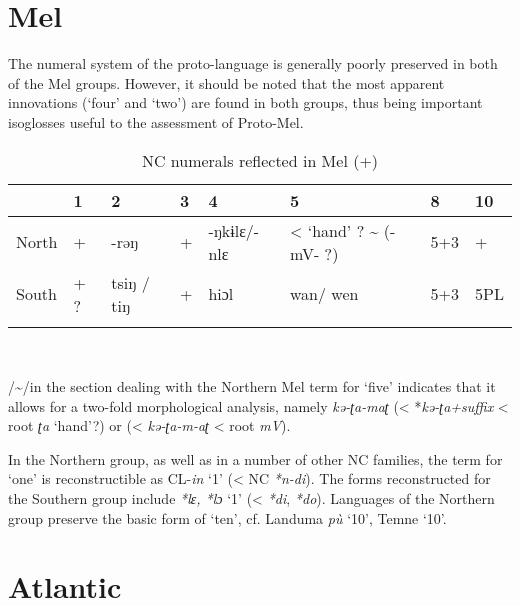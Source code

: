 \section{Mel}%
 
The numeral system of the proto-language is generally poorly preserved in both of the Mel groups. However, it should be noted that the most apparent innovations (‘four’ and ‘two’) are found in both groups, thus being important isoglosses useful to the assessment of Proto-Mel.

\begin{table}
\caption{\label{tab:5:11} NC numerals reflected in Mel (+)} 
\begin{tabularx}{\textwidth}{llllllll} 
\lsptoprule
& {{1}} &  {{2}} & {{3}} & {{4}} & {5} & {8} & {{10}}\\
\midrule 
{{North}} & {{+}} & {-rəŋ} & {{+}} & {{-ŋkɨlɛ/-nlɛ}} & {{<} {‘hand’} ? {{\textasciitilde} (-mV- ?)}} & {{5+3}} & {+}\\
{South} & {{+} ?} & {{tsiŋ} {/} {tiŋ}} & {{+}} & {{hiɔl}} & {wan/} {wen} & {5+3} & {{5PL}}\\
\lspbottomrule
\end{tabularx}
\\
\raggedright\footnotesize
/{\textasciitilde}/in the section dealing with the Northern Mel term for ‘five’ indicates that it allows for a two-fold morphological analysis, namely \textit{kə-ʈa-maʈ} (< *\textit{kə-ʈa+suffix} < root \textit{ʈa} ‘hand’?) or (< \textit{kə-ʈa-m-aʈ} < root \textit{mV}).
\end{table}


In the Northern group, as well as in a number of other NC families, the term for ‘one’ is reconstructible as CL-\textit{in} ‘1’ (< NC \textit{*n}\textit{-}\textit{di}). The forms reconstructed for the Southern group include \textit{*l}\textit{ɛ, *l}\textit{ɔ} ‘1’ (< \textit{*di}, \textit{*do}). Languages of the Northern group preserve the basic form of ‘ten’, cf. Landuma  \textit{pù} ‘10’, Temne ‘10’.


\section{Atlantic}\label{sec:5.12}%
 
